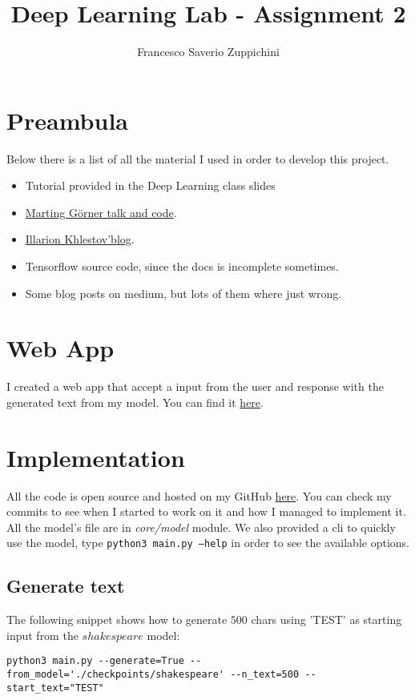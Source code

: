 \documentclass[11pt]{article}
\title{Deep Learning Lab - Assignment 2}
\author{Francesco Saverio Zuppichini}
\begin{document}
\maketitle
\section{Preambula}
Below there is a list of all the material I used in order to develop this project. 
\begin{itemize}
	\item Tutorial provided in the Deep Learning class slides
	\item \href{https://www.youtube.com/watch?v=vq2nnJ4g6N0}{Marting Görner talk and code}.
	\item \href{https://ikhlestov.github.io/pages/machine-learning/tensorflow-hints/}{Illarion Khlestov'blog}.
	\item Tensorflow source code, since the docs is incomplete sometimes.
	\item Some blog posts on medium, but lots of them where just wrong. 
 \end{itemize}
\section{Web App}
I created a web app that accept a input from the user and response with the generated text from my model. You can find it \href{https://your-shakespeare.herokuapp.com/}{here}.
\section{Implementation}
All the code is open source and hosted on my GitHub \href{https://github.com/FrancescoSaverioZuppichini/LSTM-Text-Generator}{here}. You can check my commits to see when I started to work on it and how I managed to implement it. All the model's file are in \emph{core/model} module.  We also provided a cli to quickly use the model, type \texttt{python3 main.py --help} in order to see the available options.
\subsection{Generate text}
The following snippet shows how to generate $500$ chars using 'TEST' as starting input from the $shakespeare$ model:
\begin{lstlisting}[breaklines=true]
python3 main.py --generate=True --from_model='./checkpoints/shakespeare' --n_text=500 --start_text="TEST"	
\end{lstlisting}
\end{document}
